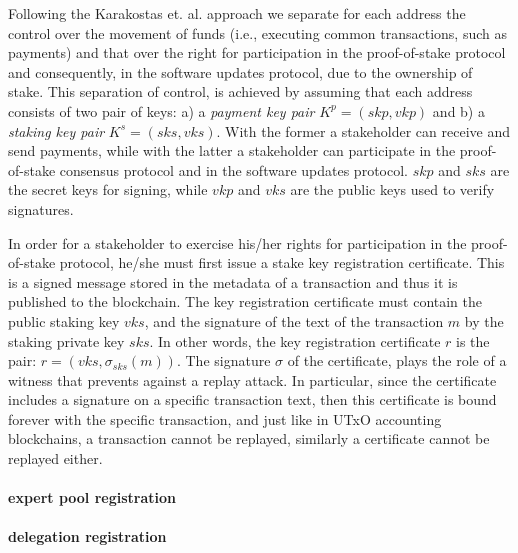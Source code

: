 Following the Karakostas et. al. \cite{stakepools} approach we separate for each address the control over the movement of funds (i.e., executing common transactions, such as payments) and that over the right for participation in the proof-of-stake protocol and consequently, in the software updates protocol, due to the ownership of stake. This separation of control, is achieved by assuming that each address consists of two pair of keys: a) a \emph{payment key pair} $K^p = (skp,vkp)$ and b) a \emph{staking key pair} $K^s = (sks, vks)$. With the former a stakeholder can receive and send payments, while with the latter a stakeholder can participate in the proof-of-stake consensus protocol and in the software updates protocol. $skp$ and $sks$ are the secret keys for signing, while $vkp$ and $vks$ are the public keys used to verify signatures.

In order for a stakeholder to exercise his/her rights for participation in the proof-of-stake protocol, he/she must first issue a stake key registration certificate. This is a signed message stored in the metadata of a transaction and thus it is published to the blockchain. The key registration certificate must contain the public staking key $vks$, and the signature of the text of the transaction $m$ by the staking private key $sks$. In other words, the key registration certificate $r$ is the pair: $r = (vks, \sigma_{sks}(m))$. The signature $\sigma$ of the certificate, plays the role of a witness that prevents against a replay attack. In particular, since the certificate includes a signature on a specific transaction text, then this certificate is bound forever with the specific transaction, and just like in UTxO accounting blockchains, a transaction cannot be replayed, similarly a certificate cannot be replayed either.

\paragraph{expert pool registration}

\paragraph{delegation registration}

